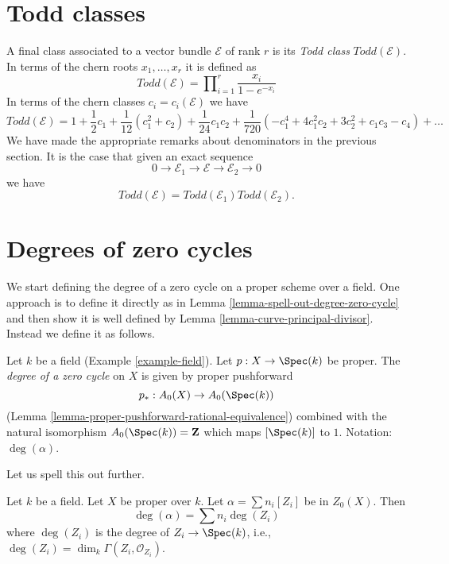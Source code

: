 \section{Todd classes}
\label{section-todd-classes}

\noindent
A final class associated to a vector bundle $\mathcal{E}$
of rank $r$ is its {\it Todd class} $Todd(\mathcal{E})$.
In terms of the chern roots $x_1, \ldots, x_r$ it is
defined as
$$
Todd(\mathcal{E})
=
\prod\nolimits_{i = 1}^r
\frac{x_i}{1 - e^{-x_i}}
$$
In terms of the chern classes $c_i = c_i(\mathcal{E})$
we have
$$
Todd(\mathcal{E})
=
1
+
\frac{1}{2}c_1
+
\frac{1}{12}(c_1^2 + c_2)
+
\frac{1}{24}c_1c_2
+
\frac{1}{720}(-c_1^4 + 4c_1^2c_2 + 3c_2^2 + c_1c_3 - c_4)
+
\ldots
$$
We have made the appropriate remarks about denominators
in the previous section. It is the case that
given an exact sequence
$$
0
\to
{\mathcal E}_1
\to
{\mathcal E}
\to
{\mathcal E}_2
\to
0
$$
we have
$$
Todd({\mathcal E}) = Todd({\mathcal E}_1) Todd({\mathcal E}_2).
$$




\section{Degrees of zero cycles}
\label{section-degree-zero-cycles}

\noindent
We start defining the degree of a zero cycle on a proper scheme over a field.
One approach is to define it directly as in
Lemma \ref{lemma-spell-out-degree-zero-cycle} and then show
it is well defined by
Lemma \ref{lemma-curve-principal-divisor}.
Instead we define it as follows.

\begin{definition}
\label{definition-degree-zero-cycle}
Let $k$ be a field (Example \ref{example-field}). Let $p : X \to \Spec(k)$
be proper. The {\it degree of a zero cycle} on $X$ is given by proper
pushforward
$$
p_* : A_0(X) \to A_0(\Spec(k))
$$
(Lemma \ref{lemma-proper-pushforward-rational-equivalence})
combined with the natural isomorphism $A_0(\Spec(k)) = \mathbf{Z}$
which maps $[\Spec(k)]$ to $1$. Notation: $\deg(\alpha)$.
\end{definition}

\noindent
Let us spell this out further.

\begin{lemma}
\label{lemma-spell-out-degree-zero-cycle}
Let $k$ be a field. Let $X$ be proper over $k$. Let $\alpha = \sum n_i[Z_i]$
be in $Z_0(X)$. Then
$$
\deg(\alpha) = \sum n_i\deg(Z_i)
$$
where $\deg(Z_i)$ is the degree of $Z_i \to \Spec(k)$, i.e.,
$\deg(Z_i) = \dim_k \Gamma(Z_i, \mathcal{O}_{Z_i})$.
\end{lemma}

